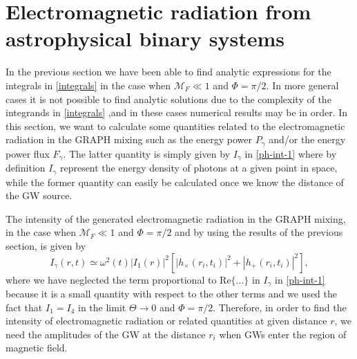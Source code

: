 \documentclass[a4paper,11pt]{article}
\begin{document}
\section{Electromagnetic radiation from astrophysical binary systems}
\label{sec:7}

In the previous section we have been able to find analytic expressions for the integrals in \eqref{integrals} in the case when $\mathcal M_F\ll 1$ and $\Phi=\pi/2$. In more general cases it is not possible to find analytic solutions due to the complexity of the integrands in \eqref{integrals} ,and in these cases numerical results may be in order. In this section, we want to calculate some quantities related to the electromagnetic radiation in the GRAPH mixing such as the energy power $P_{\gamma}$ and/or the energy power flux $F_\gamma$. The latter quantity is simply given by $I_\gamma$ in \eqref{ph-int-1} where by definition $I_\gamma$ represent the energy density of photons at a given point in space, while the former quantity can easily be calculated once we know the distance of the GW source. 

The intensity of the generated electromagnetic radiation in the GRAPH mixing, in the case when $\mathcal M_F\ll 1$ and $\Phi=\pi/2$ and by using the results of the previous section, is given by
\begin{equation}\label{I1-4}
I_\gamma(r, t) \simeq \omega^2(t) |I_1(r)|^2 \left[  | h_\times(r_i, t_i)|^2 + | h_+(r_i, t_i)|^2 \right],
\end{equation}
where we have neglected the term proportional to $\text{Re}\{...\}$ in $I_\gamma$ in \eqref{ph-int-1} because it is a small quantity with respect to the other terms and we used the fact that $I_1=I_4$ in the limit $\Theta\rightarrow 0$ and $\Phi=\pi/2$. Therefore, in order to find the intensity of electromagnetic radiation or related quantities at given distance $r$, we need the amplitudes of the GW at the distance $r_i$ when GWs enter the region of magnetic field.
\end{document}
